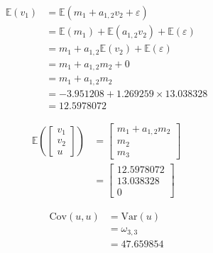 \documentclass[
]{book}
\begin{document}
\begin{equation}
  \begin{split}
    \mathbb{E}
    \left(
      v_1
    \right)
    &=
    \mathbb{E}
    \left(
      m_1 + a_{1, 2} v_2 + \varepsilon
    \right) \\
    &=
    \mathbb{E}
    \left(
      m_1
    \right)
    +
    \mathbb{E}
    \left(
      a_{1, 2} v_2
    \right)
    +
    \mathbb{E}
    \left(
      \varepsilon
    \right) \\
    &=
    m_1
    +
    a_{1, 2}
    \mathbb{E}
    \left(
      v_2
    \right)
    +
    \mathbb{E}
    \left(
      \varepsilon
    \right) \\
    &=
    m_1
    +
    a_{1, 2}
    m_2
    +
    0 \\
    &=
    m_1
    +
    a_{1, 2}
    m_2 \\
    &=
    -3.951208
    +
    1.269259
    \times
    13.038328 \\
    &=
    12.5978072
  \end{split}
\end{equation}

\begin{equation}
  \begin{split}
    \mathbb{E}
    \left(
      \begin{bmatrix}
        v_1 \\
        v_2 \\
        u
      \end{bmatrix}
    \right)
    &=
    \begin{bmatrix}
      m_1 + a_{1, 2} m_2 \\
      m_2 \\
      m_3
    \end{bmatrix} \\
    &=
    \begin{bmatrix}
      12.5978072 \\
      13.038328 \\
      0
    \end{bmatrix}
  \end{split}
\end{equation}

\begin{equation}
  \begin{split}
    \mathrm{Cov}
    \left(
      u,
      u 
    \right)
    &=
    \mathrm{Var}
    \left(
      u 
    \right) \\
    &=
    \omega_{3, 3} \\
    &=
    47.659854
  \end{split}
\end{equation}
\end{document}
